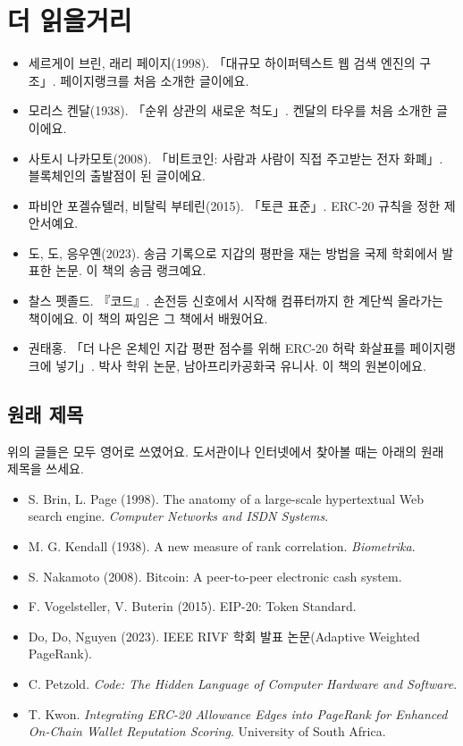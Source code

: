 \chapter{더 읽을거리}

\begin{itemize}\raggedright
\item 세르게이 브린, 래리 페이지(1998). 「대규모 하이퍼텍스트 웹 검색 엔진의 구조」. 페이지랭크를 처음 소개한 글이에요.
\item 모리스 켄달(1938). 「순위 상관의 새로운 척도」. 켄달의 타우를 처음 소개한 글이에요.
\item 사토시 나카모토(2008). 「비트코인: 사람과 사람이 직접 주고받는 전자 화폐」. 블록체인의 출발점이 된 글이에요.
\item 파비안 포겔슈텔러, 비탈릭 부테린(2015). 「토큰 표준」. ERC-20 규칙을 정한 제안서예요.
\item 도, 도, 응우옌(2023). 송금 기록으로 지갑의 평판을 재는 방법을 국제 학회에서 발표한 논문. 이 책의 송금 랭크예요.
\item 찰스 펫졸드. 『코드』. 손전등 신호에서 시작해 컴퓨터까지 한 계단씩 올라가는 책이에요. 이 책의 짜임은 그 책에서 배웠어요.
\item 권태홍. 「더 나은 온체인 지갑 평판 점수를 위해 ERC-20 허락 화살표를 페이지랭크에 넣기」. 박사 학위 논문, 남아프리카공화국 유니사. 이 책의 원본이에요.
\end{itemize}

\section{원래 제목}

위의 글들은 모두 영어로 쓰였어요. 도서관이나 인터넷에서 찾아볼 때는 아래의 원래 제목을 쓰세요.

{\small
\begin{itemize}\raggedright
\item S. Brin, L. Page (1998). The anatomy of a large-scale hypertextual Web search engine. \textit{Computer Networks and ISDN Systems}.
\item M. G. Kendall (1938). A new measure of rank correlation. \textit{Biometrika}.
\item S. Nakamoto (2008). Bitcoin: A peer-to-peer electronic cash system.
\item F. Vogelsteller, V. Buterin (2015). EIP-20: Token Standard.
\item Do, Do, Nguyen (2023). IEEE RIVF 학회 발표 논문(Adaptive Weighted PageRank).
\item C. Petzold. \textit{Code: The Hidden Language of Computer Hardware and Software}.
\item T. Kwon. \textit{Integrating ERC-20 Allowance Edges into PageRank for Enhanced On-Chain Wallet Reputation Scoring}. University of South Africa.
\end{itemize}
}
